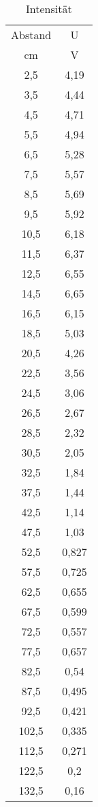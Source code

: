 

\begin{table}
  \centering
  \caption{Intensität}
  \label{tab:Intensität}
  \begin{tabular}{c c }
    \toprule
     Abstand &	 U	   \\
      cm  &V\\
    \midrule
2,5 	& 4,19\\
3,5 	& 4,44\\
4,5 	& 4,71\\
5,5 	& 4,94\\
6,5 	& 5,28\\
7,5 	& 5,57\\
8,5 	& 5,69\\
9,5 	& 5,92\\
10,5	& 6,18\\
11,5	& 6,37\\
12,5	& 6,55\\
14,5	& 6,65\\
16,5	& 6,15\\
18,5	& 5,03\\
20,5	& 4,26\\
22,5	& 3,56\\
24,5	& 3,06\\
26,5	& 2,67\\
28,5	& 2,32\\
30,5	& 2,05\\
32,5	& 1,84\\
37,5	& 1,44\\
42,5	& 1,14\\
47,5	& 1,03\\
52,5	& 0,827\\
57,5	& 0,725\\
62,5	& 0,655\\
67,5	& 0,599\\
72,5	& 0,557\\
77,5	& 0,657\\
82,5	& 0,54\\
87,5	& 0,495\\
92,5	& 0,421\\
102,5	& 0,335\\
112,5	& 0,271\\
122,5	& 0,2\\
132,5	& 0,16\\

    \bottomrule
  \end{tabular}
\end{table}
